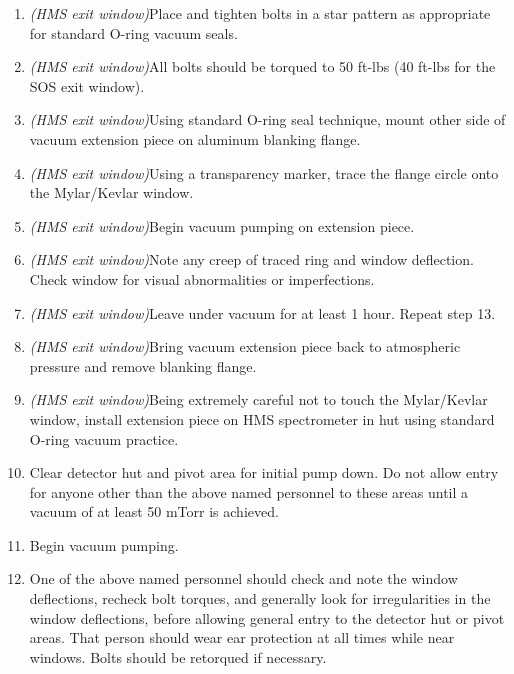 \begin{enumerate}
\item{{\sl (HMS exit window)}Place and tighten bolts in a star pattern as appropriate for
standard O-ring vacuum seals.}

\item{{\sl (HMS exit window)}All bolts should be torqued to 50 ft-lbs (40 ft-lbs for the SOS
exit window).}

\item{{\sl (HMS exit window)}Using standard O-ring seal technique, mount other side of
vacuum extension piece on aluminum blanking flange.}

\item{{\sl (HMS exit window)}Using a transparency marker, trace the flange circle onto the
Mylar/Kevlar window.}

\item{{\sl (HMS exit window)}Begin vacuum pumping on extension
piece.} 

\item{{\sl (HMS exit window)}Note any creep of traced ring and window
deflection.  Check window for visual abnormalities or imperfections.}

\item{{\sl (HMS exit window)}Leave under vacuum for at least 1 hour.
Repeat step 13.}

\item{{\sl (HMS exit window)}Bring vacuum extension piece back to
atmospheric pressure and remove blanking flange.}

\item{{\sl (HMS exit window)}Being extremely careful not to touch the
Mylar/Kevlar window, install extension piece on HMS spectrometer in
hut using standard O-ring vacuum practice.}

\item{Clear detector hut and pivot area for initial pump down. Do not
allow entry for anyone other than the above named personnel to
these areas until a vacuum of at least 50 mTorr is achieved.}

\item{Begin vacuum pumping.}

\item{One of the above named personnel should check and note the
window deflections, recheck bolt torques, and generally look for
irregularities in the window deflections, before allowing
general entry to the detector
hut or pivot areas. That person should wear ear protection at all times while
near windows. Bolts should be retorqued if necessary.}


\end{enumerate}
